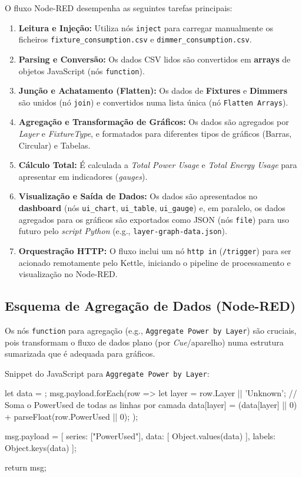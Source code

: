 \documentclass[a4paper, 12pt]{article}
\begin{document}
	O fluxo Node-RED desempenha as seguintes tarefas principais:
	\begin{enumerate}
		\item \textbf{Leitura e Injeção:} Utiliza nós \texttt{inject} para carregar manualmente os ficheiros \texttt{fixture\_consumption.csv} e \texttt{dimmer\_consumption.csv}.
		\item \textbf{Parsing e Conversão:} Os dados CSV lidos são convertidos em \textbf{arrays} de objetos JavaScript (nós \texttt{function}).
		\item \textbf{Junção e Achatamento (Flatten):} Os dados de \textbf{Fixtures} e \textbf{Dimmers} são unidos (nó \texttt{join}) e convertidos numa lista única (nó \texttt{Flatten Arrays}).
		\item \textbf{Agregação e Transformação de Gráficos:} Os dados são agregados por \textit{Layer} e \textit{FixtureType}, e formatados para diferentes tipos de gráficos (Barras, Circular) e Tabelas.
		\item \textbf{Cálculo Total:} É calculada a \textit{Total Power Usage} e \textit{Total Energy Usage} para apresentar em indicadores (\textit{gauges}).
		\item \textbf{Visualização e Saída de Dados:} Os dados são apresentados no \textbf{dashboard} (nós \texttt{ui\_chart}, \texttt{ui\_table}, \texttt{ui\_gauge}) e, em paralelo, os dados agregados para os gráficos são exportados como JSON (nós \texttt{file}) para uso futuro pelo \textit{script Python} (e.g., \texttt{layer-graph-data.json}).
		\item \textbf{Orquestração HTTP:} O fluxo inclui um nó \texttt{http in} (\texttt{/trigger}) para ser acionado remotamente pelo Kettle, iniciando o pipeline de processamento e visualização no Node-RED.
	\end{enumerate}
	
	\subsection{Esquema de Agregação de Dados (Node-RED)}
	Os nós \texttt{function} para agregação (e.g., \texttt{Aggregate Power by Layer}) são cruciais, pois transformam o fluxo de dados plano (por \textit{Cue}/aparelho) numa estrutura sumarizada que é adequada para gráficos.
	
	Snippet do JavaScript para \texttt{Aggregate Power by Layer}:
	\noindent
\begin{KettleCode}
let data = {};
msg.payload.forEach(row => {
	let layer = row.Layer || 'Unknown';
	// Soma o PowerUsed de todas as linhas por camada
	data[layer] = (data[layer] || 0) + parseFloat(row.PowerUsed || 0);
});
		
msg.payload = [{
	series: ["PowerUsed"],
	data: [ Object.values(data) ],
	labels: Object.keys(data)
}];
		
return msg;
\end{KettleCode}
	
\end{document}
